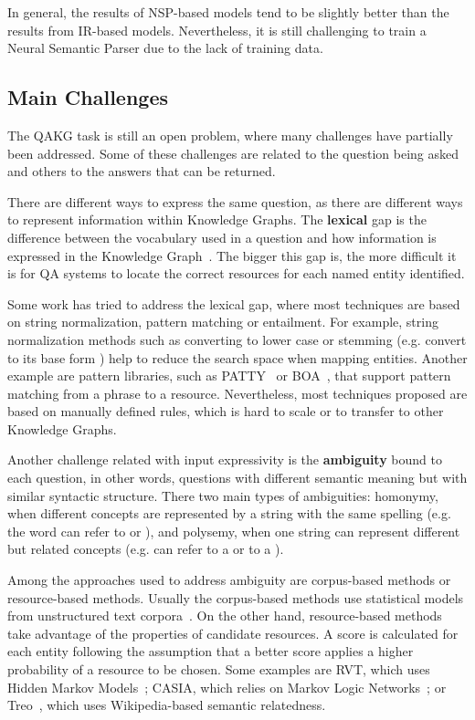 In general, the results of NSP-based models tend to be slightly better than the results from 
IR-based models. Nevertheless, it is still challenging to train a Neural Semantic Parser due to 
the lack of training data.

\subsection{Main Challenges}
\label{cap2:theoFrame/qakg/challenges}
The QAKG task is still an open problem, where many challenges have partially been addressed. 
Some of these challenges are related to the question being asked and others to the answers that 
can be returned. 

There are different ways to express the same question, as there are different ways to represent 
information within Knowledge Graphs. The \textbf{lexical} gap is the difference between the 
vocabulary used in a question and how information is expressed in the Knowledge 
Graph~\cite{semPar:lexical-gap-HakimovUWC15}. The bigger this gap is, the more difficult it is 
for QA systems to locate the correct resources for each named entity identified. 

Some work has tried to address the lexical gap, where most techniques are based on string 
normalization, pattern matching or entailment. For example, string normalization methods such 
as converting to lower case or stemming (e.g. convert  to its base form 
) help to reduce the search space when mapping entities. Another example are 
pattern libraries, such as PATTY~\cite{qa:NakasholeWS12} or BOA~\cite{qa:GerberN12}, that 
support pattern matching from a phrase to a resource. Nevertheless, most techniques proposed 
are based on manually defined rules, which is hard to scale or to transfer to other Knowledge 
Graphs.

Another challenge related with input expressivity is the \textbf{ambiguity} bound to each 
question, in other words, questions with different semantic meaning but with similar syntactic 
structure. There two main types of ambiguities: homonymy, when different concepts are 
represented by a string with the same spelling (e.g. the word  can refer to 
 or ), and polysemy, when one string can 
represent different but related concepts (e.g.  can refer to a 
 or to a ). 

Among the approaches used to address ambiguity are corpus-based methods or resource-based 
methods. Usually the corpus-based methods use statistical models from unstructured text 
corpora~\cite{qa:shirai1997,qa:ShenYYJLC11}. On the other hand, resource-based methods take 
advantage of the \RDF{} properties of candidate resources. A score is calculated for each entity 
following the assumption that a better score applies a higher probability of a resource to be 
chosen. Some examples are RVT, which uses Hidden Markov Models~\cite{qa:GiannoneBB13}; CASIA, 
which relies on Markov Logic Networks~\cite{qa:shizhu2014casia}; or Treo~\cite{qa:freitas2011treo,
qa:FreitasOOSC13}, which uses Wikipedia-based semantic relatedness.

